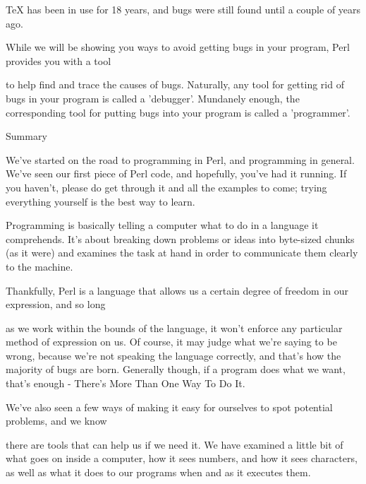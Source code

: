 \documentclass[a4paper,11pt]{book}
\begin{document}
\noindent TeX has been in use for 18 years, and bugs were still found until a couple of years ago.

\noindent 

\noindent While we will be showing you ways to avoid getting bugs in your program, Perl provides you with a tool

\noindent to help find and trace the causes of bugs. Naturally, any tool for getting rid of bugs in your program is called a 'debugger'. Mundanely enough, the corresponding tool for putting bugs into your program is called a 'programmer'.

\noindent 

\noindent 

\noindent Summary

\noindent 

\noindent We've started on the road to programming in Perl, and programming in general. We've seen our first piece of Perl code, and hopefully, you've had it running. If you haven't, please do get through it and all the examples to come; trying everything yourself is the best way to learn.

\noindent 

\noindent Programming is basically telling a computer what to do in a language it comprehends. It's about breaking down problems or ideas into byte-sized chunks (as it were) and examines the task at hand in order to communicate them clearly to the machine.

\noindent 

\noindent Thankfully, Perl is a language that allows us a certain degree of freedom in our expression, and so long

\noindent as we work within the bounds of the language, it won't enforce any particular method of expression on us. Of course, it may judge what we're saying to be wrong, because we're not speaking the language correctly, and that's how the majority of bugs are born. Generally though, if a program does what we want, that's enough - There's More Than One Way To Do It.

\noindent 

\noindent 

\noindent We've also seen a few ways of making it easy for ourselves to spot potential problems, and we know

\noindent there are tools that can help us if we need it. We have examined a little bit of what goes on inside a computer, how it sees numbers, and how it sees characters, as well as what it does to our programs when and as it executes them.
\end{document}
